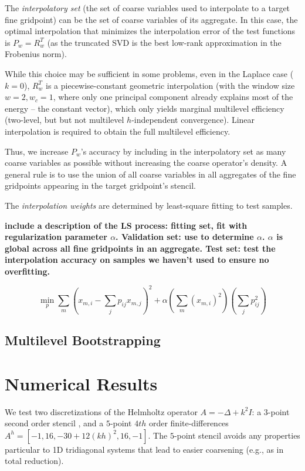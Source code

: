 \documentclass{article}
\begin{document}
The \emph{interpolatory set} (the set of coarse variables used to interpolate to a target fine gridpoint) can be the set of coarse variables of its aggregate. In this case, the optimal interpolation that minimizes the interpolation error of the test functions is $P_w = R_w^T$ (as the truncated SVD is the best low-rank approximation in the Frobenius norm).

While this choice may be sufficient in some problems, even in the Laplace case ($k=0$), $R_w^T$ is a piecewise-constant geometric interpolation (with the window size $w = 2, w_c = 1$, where only one principal component already explains most of the energy -- the constant vector), which only yields marginal multilevel efficiency (two-level, but but not multilevel $h$-independent convergence). Linear interpolation is required to obtain the full multilevel efficiency.

Thus, we increase $P_w$'s accuracy by including in the interpolatory set as many coarse variables as possible without increasing the coarse operator's density. A general rule is to use the union of all coarse variables in all aggregates of the fine gridpoints appearing in the target gridpoint's stencil.

The \emph{interpolation weights} are determined by least-square fitting to test samples.

{\bf include a description of the LS process: fitting set, fit with regularization parameter $\alpha$. Validation set: use to determine $\alpha$. $\alpha$ is global across all fine gridpoints in an aggregate. Test set: test the interpolation accuracy on samples we haven't used to ensure no overfitting.
}

\begin{equation}
	\min_p \sum_m \left( x_{m,i} - \sum_j p_{ij} x_{m,j} \right)^2 + \alpha \left( \sum_m (x_{m,i})^2 \right) \left(\sum_j p_{ij}^2\right) 
\end{equation}

\subsection{Multilevel Bootstrapping}

\section{Numerical Results}
We test two discretizations of the Helmholtz operator $A = -\Delta + k^2 I$: a $3$-point second order stencil , and a $5$-point $4th$ order finite-differences $A^h = [-1, 16, -30 + 12 (kh)^2, 16, -1]$. The $5$-point stencil avoids any properties particular to 1D tridiagonal systems that lead to easier coarsening (e.g., as in total reduction).
\end{document}

